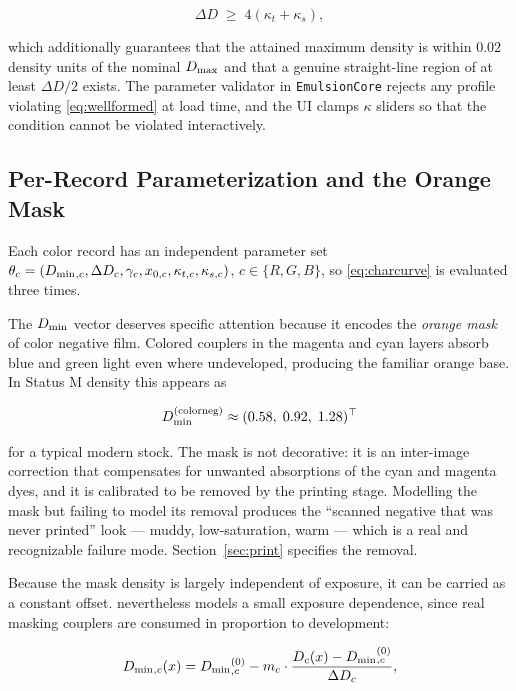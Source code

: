 \begin{equation}
\Delta D \;\geq\; 4\left(\kappa_t + \kappa_s\right),
\label{eq:wellformed}
\end{equation}

which additionally guarantees that the attained maximum density is within
$0.02$ density units of the nominal $D_{\max}$ and that a genuine straight-line
region of at least $\Delta D / 2$ exists. The parameter validator in
\texttt{EmulsionCore} rejects any profile violating \eqref{eq:wellformed} at
load time, and the UI clamps $\kappa$ sliders so that the condition cannot be
violated interactively.

\subsection{Per-Record Parameterization and the Orange Mask}

Each color record has an independent parameter set
$\theta_c = (D_{\min}{}_{,c}, \Delta D_c, \gamma_c, x_{0,c}, \kappa_{t,c},
\kappa_{s,c})$, $c \in \{R,G,B\}$, so \eqref{eq:charcurve} is evaluated three
times.

The $D_{\min}$ vector deserves specific attention because it encodes the
\emph{orange mask} of color negative film. Colored couplers in the magenta and
cyan layers absorb blue and green light even where undeveloped, producing the
familiar orange base. In Status M density \cite{iso5} this appears as

\begin{equation}
D_{\min}^{\mathrm{(colorneg)}} \approx (0.58,\; 0.92,\; 1.28)^\top
\end{equation}

for a typical modern stock. The mask is not decorative: it is an
inter-image correction that compensates for unwanted absorptions of the cyan
and magenta dyes, and it is calibrated to be removed by the printing stage.
Modelling the mask but failing to model its removal produces the ``scanned
negative that was never printed'' look --- muddy, low-saturation, warm ---
which is a real and recognizable failure mode. Section~\ref{sec:print}
specifies the removal.

Because the mask density is largely independent of exposure, it can be carried
as a constant offset. \EM{} nevertheless models a small exposure dependence,
since real masking couplers are consumed in proportion to development:

\begin{equation}
D_{\min}{}_{,c}(x) = D_{\min}{}_{,c}^{(0)} - m_c \cdot \frac{D_c(x) - D_{\min}{}_{,c}^{(0)}}{\Delta D_c},
\label{eq:maskdepletion}
\end{equation}

